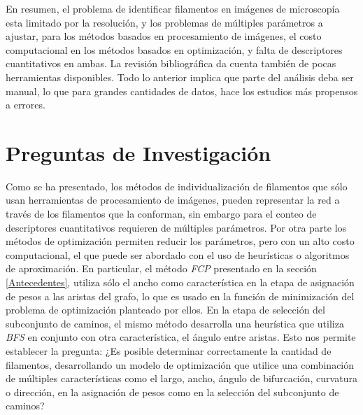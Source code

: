 \documentclass{article}
\begin{document}
En resumen, el problema de identificar filamentos en im\'agenes de microscop\'ia esta limitado por la resoluci\'on, y los problemas de m\'ultiples par\'ametros a ajustar, para los m\'etodos basados en procesamiento de im\'agenes, el costo computacional en los m\'etodos basados en optimizaci\'on, y falta de descriptores cuantitativos en ambas. La revisi\'on bibliogr\'afica da cuenta tambi\'en de pocas herramientas disponibles. Todo lo anterior implica que parte del an\'alisis deba ser manual, lo que para grandes cantidades de datos, hace los estudios m\'as propensos a errores. 

\section{Preguntas de Investigaci\'on}

Como se ha presentado, los m\'etodos de individualizaci\'on de filamentos que s\'olo usan herramientas de procesamiento de im\'agenes, pueden representar la red a trav\'es de los filamentos que la conforman, sin embargo para el conteo de descriptores cuantitativos requieren de m\'ultiples par\'ametros. Por otra parte los m\'etodos de optimizaci\'on permiten reducir los par\'ametros, pero con un alto costo computacional, el que puede ser abordado con el uso de heur\'isticas o algoritmos de aproximaci\'on. 
En particular, el m\'etodo {\it FCP} presentado en la secci\'on \ref{Antecedentes}, utiliza s\'olo el ancho como caracter\'istica en la etapa de asignaci\'on de pesos a las aristas del grafo, lo que es usado en la funci\'on de minimizaci\'on del problema de optimizaci\'on planteado por ellos. En la etapa de selecci\'on del subconjunto de caminos, el mismo m\'etodo desarrolla una heur\'istica que utiliza {\it BFS} en conjunto con otra caracter\'istica, el \'angulo entre aristas.
Esto nos permite establecer la pregunta:
\smallskip
¿Es posible determinar correctamente la cantidad de filamentos, desarrollando un modelo de optimizaci\'on que utilice una combinaci\'on de m\'ultiples caracter\'isticas como el largo, ancho, ángulo de bifurcación, curvatura o dirección, en la asignaci\'on de pesos como en la selecci\'on del subconjunto de caminos?
\smallskip
\end{document}
